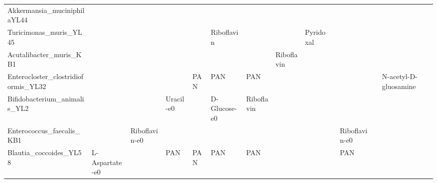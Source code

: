 \begin{tabular}{lllllllllllll}
Akkermansia\_muciniphilaYL44         &                          &                            &                                 &                             &                              &                             &                        &                         &                                     &                              &                           &                        \\
Turicimonas\_muris\_YL45              &                          &                            &                                 &                             &                   Riboflavin &                             &                        &               Pyridoxal &                                     &                              &                           &                        \\
Acutalibacter\_muris\_KB1             &                          &                            &                                 &                             &                              &                             &             Riboflavin &                         &                                     &                              &                           &                        \\
Enterocloster\_clostridioformis\_YL32 &                          &                            &                                 &                         PAN &                          PAN &                         PAN &                        &                         &                                     &                              &                           &  N-acetyl-D-gluosamine \\
Bifidobacterium\_animalis\_YL2        &                          &                            &                       Uracil-e0 &                             &                 D-Glucose-e0 &                  Riboflavin &                        &                         &                                     &                              &                           &                        \\
Enterococcus\_faecalis\_KB1           &                          &              Riboflavin-e0 &                                 &                             &                              &                             &                        &                         &                                     &                Riboflavin-e0 &                           &                        \\
Blautia\_coccoides\_YL58              &           L-Aspartate-e0 &                            &                             PAN &                         PAN &                          PAN &                         PAN &                        &                         &                                     &                          PAN &                           &                        \\
\bottomrule
\end{tabular}
